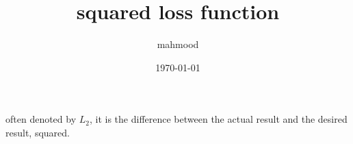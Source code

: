 \documentclass[a4paper,12pt]{article}
\author{mahmood}
\date{\today}
\title{squared loss function}
\begin{document}
\maketitle
often denoted by \(L_2\), it is the difference between the actual result and the desired result, squared.
\end{document}
